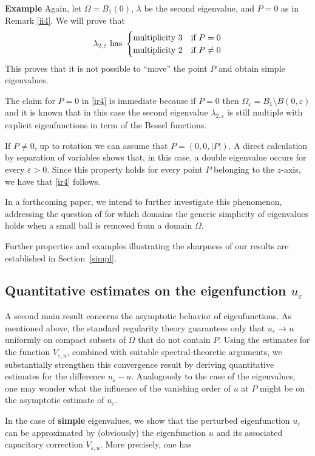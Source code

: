 \documentclass[11pt,reqno]{article}
\numberwithin{equation}{section}
\newcommand\e\varepsilon
\newcommand\la\lambda
\renewcommand\O\Omega
\begin{document}
{\bf Example}  Again, let $\Omega=B_1(0)$, $\la$ be the second eigenvalue, and $P=0$ as in Remark \ref{ii4}. We will prove that
\begin{equation}\label{ir4}
\la_{2,\e}\hbox{ has }
\begin{cases}
\hbox{multiplicity }3&\hbox{if }P=0\\
\hbox{multiplicity }2&\hbox{if }P\ne0
\end{cases}
\end{equation}
This proves that it is not possible to ``move'' the point $P$ and obtain simple eigenvalues.

The claim for $P=0$ in \eqref{ir4} is immediate because if $P=0$ then $\O_\e=B_1\setminus B(0,\e)$ and it is known that in this case the second eigenvalue $\la_{2,\e}$ is still multiple with explicit eigenfunctions in term of the Bessel functions.

If $P\ne0$, up to rotation we can assume that $P=(0,0,|P|)$. A direct calculation by separation of variables shows that, in this case, a double eigenvalue occurs for every $\e>0$. Since this property holds for every point $P$ belonging to the $z$-axis, we have that \eqref{ir4} follows.

In a forthcoming paper, we intend to further investigate this phenomenon, addressing the question of for which domains the generic simplicity of eigenvalues holds when a small ball is removed from a domain $\O$.

     
Further properties and examples illustrating the sharpness of our results are established in Section~\ref{simpl}.



  \subsection{Quantitative estimates on the eigenfunction $u_\e$}\label{is2}
 A second main result concerns the asymptotic behavior of eigenfunctions. As mentioned above, the standard regularity theory guarantees only that $u_\e \to u$ uniformly on compact subsets of $\O$ that do not contain $P$. Using the estimates for the function $V_{\e,u}$, combined with suitable spectral-theoretic arguments, we substantially strengthen this convergence result by deriving quantitative estimates for the difference $u_\e - u$. Analogously to the case of the eigenvalues, one may wonder what the influence of the vanishing order of $u$ at $P$ might be on the asymptotic estimate of $u_\varepsilon$.
 
 In the case of {\bf simple} eigenvalues, we show that the perturbed eigenfunction $u_\varepsilon$ can be approximated by (obviously) the eigenfunction $u$ and its associated capacitary correction $V_{\e,u}$. More precisely, one has
\end{document}
